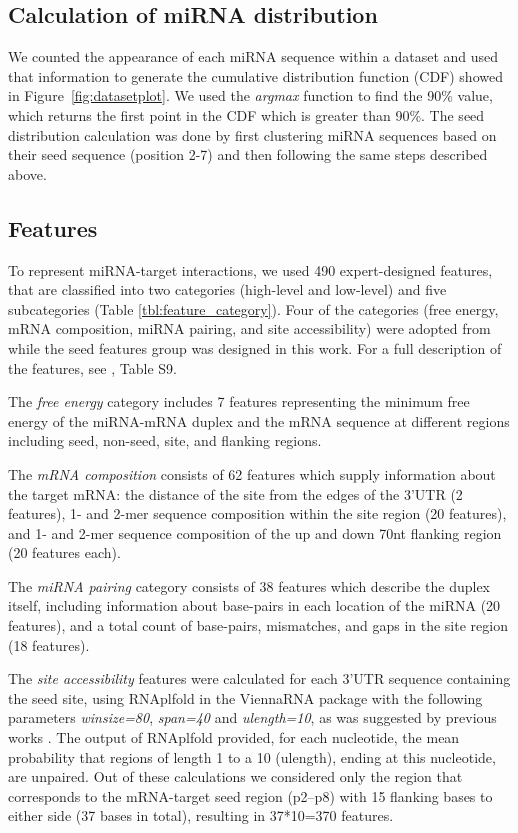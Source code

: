 \documentclass{bmcart}
\begin{document}
\subsection*{Calculation of miRNA distribution} \label{miRNAdistribution2}
We counted the appearance of each miRNA sequence within a dataset and used that information to generate the cumulative distribution function (CDF) showed in Figure~\ref{fig:datasetplot}. We used the \textit{argmax} function to find the 90\% value, which returns the first point in the CDF which is greater than 90\%. 
The seed distribution calculation was done by first clustering miRNA sequences based on their seed sequence (position 2-7) and then following the same steps described above.


\subsection*{Features} \label{methods_features}
To represent miRNA-target interactions, we used 490 expert-designed features, that are classified into two categories (high-level and low-level) and five subcategories (Table \ref{tbl:feature_category}). Four of the categories (free energy, mRNA composition, miRNA pairing, and site accessibility) were adopted from \cite{wen2018deepmirtar} while the seed features group was designed in this work. For a full description of the features, see ,  Table S9.



The \textit{free energy} category includes 7 features representing the minimum free energy of the miRNA-mRNA duplex and the mRNA sequence at different regions including seed, non-seed, site, and flanking regions. 

The \textit{mRNA composition} consists of 62 features which supply information about the target mRNA: the distance of the site from the edges of the 3'UTR (2 features), 1- and 2-mer sequence composition within the site region (20 features), and 1- and 2-mer sequence composition of the up and down 70nt flanking region (20 features each). 

The \textit{miRNA pairing} category consists of 38 features which describe the duplex itself, including information about base-pairs in each location of the miRNA (20 features), and a total count of base-pairs, mismatches, and gaps in the site region (18 features).

The \textit{site accessibility} features were calculated for each 3'UTR sequence containing the seed site, using RNAplfold in the ViennaRNA package \cite{lorenz2011viennarna} with the following parameters \textit{winsize=80}, \textit{span=40} and \textit{ulength=10}, as was suggested by previous works \cite{menor2014mirmark, wen2018deepmirtar}. The output of RNAplfold provided, for each nucleotide, the mean probability that regions of length 1 to a 10 (ulength), ending at this nucleotide, are unpaired. Out of these calculations we considered only the region that corresponds to the mRNA-target seed region (p2–p8) with 15 flanking bases to either side (37 bases in total), resulting in 37*10=370 features.
\end{document}
